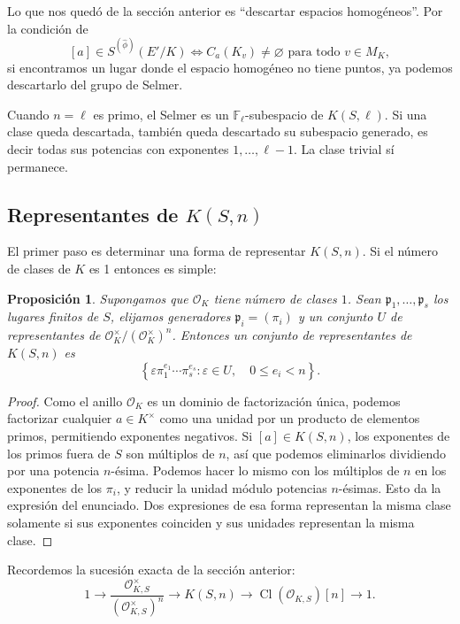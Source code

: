 \documentclass[a4paper]{book}
\theoremstyle{definition}
\theoremstyle{plain}
\newtheorem*{prop*}{Proposición}
\newcommand{\FF}{\mathbb{F}}
\newcommand{\OO}{\mathcal{O}}
\newcommand{\pp}{\mathfrak{p}}
\newcommand{\lla}{\left\lbrace}
\newcommand{\rla}{\right\rbrace}
\begin{document}
Lo que nos quedó de la sección anterior es ``descartar espacios homogéneos''. Por la condición de
\[
[a]\in S^{(\hat\phi)}(E'/K)\iff C_a(K_v)\neq\varnothing\text{ para todo }v\in M_K,
\]
si encontramos un lugar donde el espacio homogéneo no tiene puntos, ya podemos descartarlo del grupo de Selmer. 

Cuando $n=\ell$ es primo, el Selmer es un $\FF_\ell$-subespacio de $K(S,\ell)$. Si una clase queda descartada, también queda descartado su subespacio generado, es decir todas sus potencias con exponentes $1,\ldots,\ell-1$. La clase trivial sí permanece.

\subsection{Representantes de \texorpdfstring{$K(S,n)$}{K (S,n)}}

El primer paso es determinar una forma de representar $K(S,n)$. Si el número de clases de $K$ es 1 entonces es simple:

\begin{prop*}
Supongamos que $\OO_K$ tiene número de clases $1$. Sean $\pp_1,\ldots,\pp_s$ los lugares finitos de $S$, elijamos generadores $\pp_i=(\pi_i)$ y un conjunto $U$ de representantes de $\OO_K^\times/{(\OO_K^\times)}^n$. Entonces un conjunto de representantes de $K(S,n)$ es
\[
\lla\varepsilon\pi_1^{e_1}\cdots\pi_s^{e_s}:
\varepsilon\in U,\quad 0\leq e_i<n\rla.
\]
\end{prop*}

\begin{proof}
Como el anillo $\OO_K$ es un dominio de factorización única, podemos factorizar cualquier $a\in K^\times$ como una unidad por un producto de elementos primos, permitiendo exponentes negativos. Si $[a]\in K(S,n)$, los exponentes de los primos fuera de $S$ son múltiplos de $n$, así que podemos eliminarlos dividiendo por una potencia $n$-ésima. Podemos hacer lo mismo con los múltiplos de $n$ en los exponentes de los $\pi_i$, y reducir la unidad módulo potencias $n$-ésimas. Esto da la expresión del enunciado. Dos expresiones de esa forma representan la misma clase solamente si sus exponentes coinciden y sus unidades representan la misma clase.
\end{proof}

Recordemos la sucesión exacta de la sección anterior:
\[
1\longrightarrow\frac{\OO_{K,S}^\times}{{(\OO_{K,S}^\times)}^n}
\longrightarrow K(S,n)\longrightarrow \operatorname{Cl}(\OO_{K,S})[n]
\longrightarrow1.
\]
\end{document}
